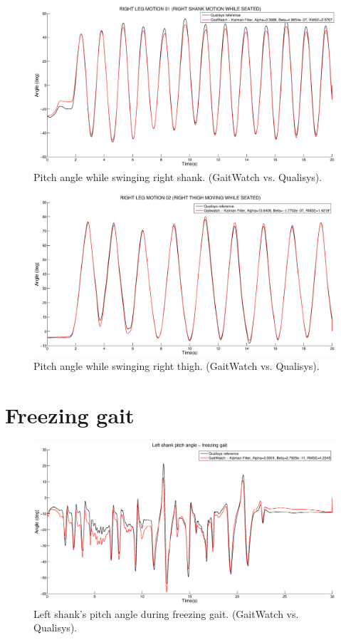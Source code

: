 \begin{figure}[H]
\centering
\includegraphics[width=1\textwidth]{figures/Right_leg_motion_01_shank.eps}
\caption{Pitch angle while swinging right shank. (GaitWatch vs. Qualisys).}
\label{fig:Right_leg_motion_01_shank}
\end{figure}

\begin{figure}[H]
\centering
\includegraphics[width=1\textwidth]{figures/Right_leg_motion_02_thigh.eps}
\caption{Pitch angle while swinging right thigh. (GaitWatch vs. Qualisys).}
\label{fig:Right_leg_motion_02_thigh}
\end{figure}

\section{Freezing gait}

\begin{figure}[H]
\centering
\includegraphics[width=1\textwidth]{figures/freezing_gait_left_shank.eps}
\caption{Left shank's pitch angle during freezing gait. (GaitWatch vs. Qualisys).}
\label{fig:freezing_gait_left_shank}
\end{figure}

